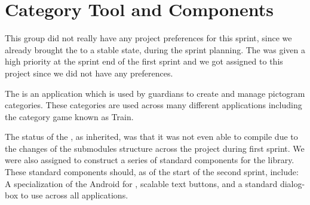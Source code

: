 \section{Category Tool and Components}

This group did not really have any project preferences for this sprint, since we already brought the \launcher to a stable state, during the sprint planning. The \giraf \ct was given a high priority at the sprint end of the first sprint and we got assigned to this project since we did not have any preferences. 

The \giraf \ct is an application which is used by guardians to create and manage pictogram categories. These categories are used across many different applications including the category game known as Train.

The status of the \ct, as inherited, was that it was not even able to compile due to the changes of the submodules structure across the project during first sprint. We were also assigned to construct a series of standard components for the  library. These standard components should, as of the start of the second sprint, include: A specialization of the Android  for \giraf, scalable text buttons, and a standard dialog-box to use across all applications.
